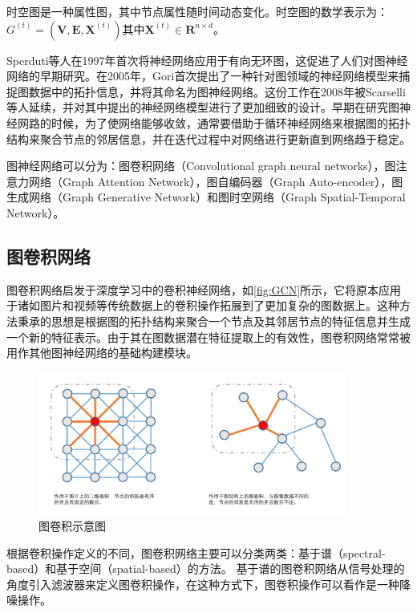 \begin{definition}[时空图]
\label{def:spatial-temporal-graph}
时空图是一种属性图，其中节点属性随时间动态变化。时空图的数学表示为：$G^{(t)}=\left(\mathbf{V}, \mathbf{E}, \mathbf{X}^{(t)}\right) \text{其中} \mathbf{X}^{(t)} \in \mathbf{R}^{n \times d}$。
\end{definition}

Sperduti\cite{sperduti1997supervised}等人在1997年首次将神经网络应用于有向无环图，这促进了人们对图神经网络的早期研究。在2005年，Gori\cite{gori2005new}首次提出了一种针对图领域的神经网络模型来捕捉图数据中的拓扑信息，并将其命名为图神经网络。这份工作在2008年被Scarselli\cite{scarselli2008graph}等人延续，并对其中提出的神经网络模型进行了更加细致的设计。早期在研究图神经网路的时候，为了使网络能够收敛，通常要借助于循环神经网络来根据图的拓扑结构来聚合节点的邻居信息，并在迭代过程中对网络进行更新直到网络趋于稳定。

图神经网络可以分为：图卷积网络（Convolutional graph neural networks），图注意力网络（Graph Attention Network），图自编码器（Graph Auto-encoder），图生成网络（Graph Generative Network）和图时空网络（Graph Spatial-Temporal Network）。

\subsection{图卷积网络}
图卷积网络启发于深度学习中的卷积神经网络，如\autoref{fig:GCN}所示，它将原本应用于诸如图片和视频等传统数据上的卷积操作拓展到了更加复杂的图数据上。这种方法秉承的思想是根据图的拓扑结构来聚合一个节点及其邻居节点的特征信息并生成一个新的特征表示。由于其在图数据潜在特征提取上的有效性，图卷积网络常常被用作其他图神经网络的基础构建模块。
\begin{figure}[htb]
    \includegraphics[width=0.9\textwidth]{fig/GCN.pdf}
    \caption{图卷积示意图}
    \label{fig:GCN}
  \end{figure}
根据卷积操作定义的不同，图卷积网络主要可以分类两类：基于谱（spectral-based）和基于空间（spatial-based）的方法。
基于谱的图卷积网络从信号处理的角度引入滤波器来定义图卷积操作，在这种方式下，图卷积操作可以看作是一种降噪操作。

